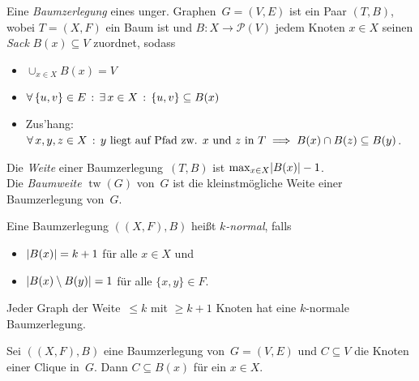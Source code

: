 \documentclass{cheat-sheet}
\newcommand{\size}[1]{\abs{#1}} %
\newcommand{\Powerset}{\mathcal{P}} %
\DeclareMathOperator{\treewidth}{tw} %
\begin{document}
\begin{defn}
  Eine \emph{Baumzerlegung} eines unger. Graphen~$G = (V, E)$ ist ein Paar $(T, B)$, wobei $T = (X, F)$ ein Baum ist und $B : X \to \Powerset(V)$ jedem Knoten $x \in X$ seinen \textit{Sack} $B(x) \subseteq V$ zuordnet, sodass
  \begin{itemize}
    \item $\cup_{x \in X} B(x) = V$
    \item $\forall \, {\{ u, v \} \in E} \,:\, \exists \, {x \in X} \,:\, \{ u, v \} \subseteq B(x)$
    \item Zus'hang: $\forall \, {x, y, z \in X} \,:\, \text{$y$ liegt auf Pfad zw. $x$ und~$z$ in~$T$} \implies B(x) \cap B(z) \subseteq B(y)$.
  \end{itemize}
  Die \emph{Weite} einer Baumzerlegung~$(T, B)$ ist ${\max}_{x \in X} \size{B(x)} - 1$. \\
  Die \emph{Baumweite} $\treewidth(G)$ von~$G$ ist die kleinstmögliche Weite einer Baumzerlegung von~$G$.
\end{defn}


\begin{defn}
  Eine Baumzerlegung $((X, F), B)$ heißt \emph{$k$-normal}, falls
  \begin{itemize}
    \item $\size{B(x)} = k + 1$ für alle $x \in X$ und
    \item $\size{B(x) \setminus B(y)} = 1$ für alle $\{ x, y \} \in F$.
  \end{itemize}
\end{defn}

\begin{lem}
  Jeder Graph der Weite~$\leq k$ mit $\geq k + 1$ Knoten hat eine $k$-normale Baumzerlegung.
\end{lem}



\begin{lem}
  Sei $((X,F), B)$ eine Baumzerlegung von~$G = (V, E)$ und $C \subseteq V$ die Knoten einer Clique in~$G$.
  Dann $C \subseteq B(x)$ für ein $x \in X$.
\end{lem}
\end{document}
